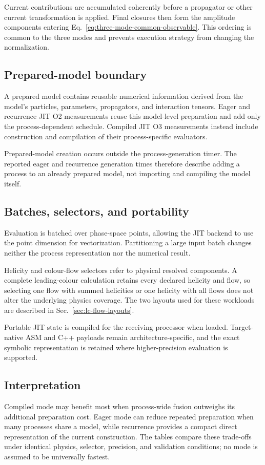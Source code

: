 Current contributions are accumulated coherently before a propagator or other
current transformation is applied. Final closures then form the amplitude
components entering Eq.~\eqref{eq:three-mode-common-observable}. This ordering
is common to the three modes and prevents execution strategy from changing the
normalization.

\subsection{Prepared-model boundary}

A prepared model contains reusable numerical information derived from the
model's particles, parameters, propagators, and interaction tensors. Eager and
recurrence JIT O2 measurements reuse this model-level preparation and add only
the process-dependent schedule. Compiled JIT O3 measurements instead include
construction and compilation of their process-specific evaluators.

Prepared-model creation occurs outside the process-generation timer. The
reported eager and recurrence generation times therefore describe adding a
process to an already prepared model, not importing and compiling the model
itself.

\subsection{Batches, selectors, and portability}

Evaluation is batched over phase-space points, allowing the JIT backend to use
the point dimension for vectorization. Partitioning a large input batch changes
neither the process representation nor the numerical result.

Helicity and colour-flow selectors refer to physical resolved components. A
complete leading-colour calculation retains every declared helicity and flow,
so selecting one flow with summed helicities or one helicity with all flows
does not alter the underlying physics coverage. The two layouts used for these
workloads are described in Sec.~\ref{sec:lc-flow-layouts}.

Portable JIT state is compiled for the receiving processor when loaded.
Target-native ASM and C++ payloads remain architecture-specific, and the exact
symbolic representation is retained where higher-precision evaluation is
supported.

\subsection{Interpretation}

Compiled mode may benefit most when process-wide fusion outweighs its
additional preparation cost. Eager mode can reduce repeated preparation when
many processes share a model, while recurrence provides a compact direct
representation of the current construction. The tables compare these
trade-offs under identical physics, selector, precision, and validation
conditions; no mode is assumed to be universally fastest.
